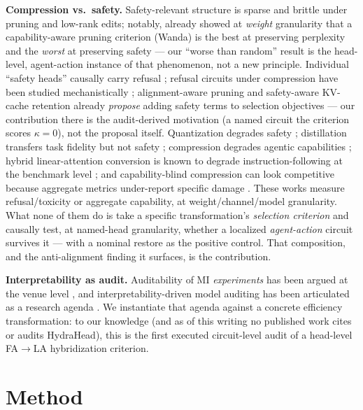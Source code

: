 \documentclass[11pt]{article}
\begin{document}
\textbf{Compression vs.\ safety.} Safety-relevant structure is sparse and brittle under pruning and
low-rank edits; notably, \citet{wei2024brittleness} already showed at \emph{weight} granularity that a
capability-aware pruning criterion (Wanda) is the best at preserving perplexity and the \emph{worst} at
preserving safety --- our ``worse than random'' result is the head-level, agent-action instance of that
phenomenon, not a new principle. Individual ``safety heads'' causally carry refusal
\citep{zhou2024safetyheads}; refusal circuits under compression have been studied mechanistically
\citep{yao2025refusalcompressed}; alignment-aware pruning \citep{patel2025aapp} and safety-aware KV-cache
retention \citep{anchorskv2026} already \emph{propose} adding safety terms to selection objectives ---
our contribution there is the audit-derived motivation (a named circuit the criterion scores $\kappa{=}0$),
not the proposal itself. Quantization degrades safety \citep{chen2025qresafe}; distillation transfers task
fidelity but not safety \citep{jahan2025distillation}; compression degrades agentic capabilities
\citep{dong2025acbench}; hybrid linear-attention conversion is known to degrade instruction-following at
the benchmark level \citep{yang2025untangling}; and capability-blind compression can look competitive
because aggregate metrics under-report specific damage \citep{cgc2026}. These works measure
refusal/toxicity or aggregate capability, at weight/channel/model granularity. What none of them do is
take a specific transformation's \emph{selection criterion} and causally test, at named-head granularity,
whether a localized \emph{agent-action} circuit survives it --- with a nominal restore as the positive
control. That composition, and the anti-alignment finding it surfaces, is the contribution.

\textbf{Interpretability as audit.} Auditability of MI \emph{experiments} has been argued at the venue
level \citep{makemi2026}, and interpretability-driven model auditing has been articulated as a research
agenda \citep{aigi2026agenda}. We instantiate that agenda against a concrete efficiency transformation:
to our knowledge (and as of this writing no published work cites or audits HydraHead), this is the first
executed circuit-level audit of a head-level FA$\to$LA hybridization criterion.

\section{Method}\label{sec:method}
\end{document}
